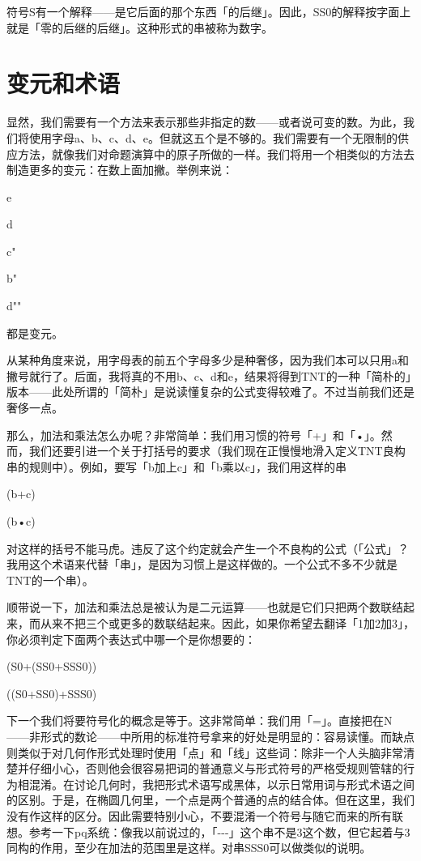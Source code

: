 \documentclass[
  12pt,
  twoside,
  openright,
  oldfontcommands,
]{memoir}
\begin{document}
符号S有一个解释------是它后面的那个东西「的后继」。因此，SS0的解释按字面上就是「零的后继的后继」。这种形式的串被称为数字。

\section{变元和术语}

显然，我们需要有一个方法来表示那些非指定的数------或者说可变的数。为此，我们将使用字母a、b、c、d、e。但就这五个是不够的。我们需要有一个无限制的供应方法，就像我们对命题演算中的原子所做的一样。我们将用一个相类似的方法去制造更多的变元：在数上面加撇。举例来说：

e

d\textquotesingle{}

c"

b"\textquotesingle{}

d""

都是变元。

从某种角度来说，用字母表的前五个字母多少是种奢侈，因为我们本可以只用a和撇号就行了。后面，我将真的不用b、c、d和e，结果将得到TNT的一种「简朴的」版本------此处所谓的「简朴」是说读懂复杂的公式变得较难了。不过当前我们还是奢侈一点。

那么，加法和乘法怎么办呢？非常简单：我们用习惯的符号「+」和「•」。然而，我们还要引进一个关于打括号的要求（我们现在正慢慢地滑入定义TNT良构串的规则中）。例如，要写「b加上c」和「b乘以c」，我们用这样的串

(b+c)

(b•c)

对这样的括号不能马虎。违反了这个约定就会产生一个不良构的公式（「公式」？我用这个术语来代替「串」，是因为习惯上是这样做的。一个公式不多不少就是TNT的一个串）。

顺带说一下，加法和乘法总是被认为是二元运算------也就是它们只把两个数联结起来，而从来不把三个或更多的数联结起来。因此，如果你希望去翻译「1加2加3」，你必须判定下面两个表达式中哪一个是你想要的：

(S0+(SS0+SSS0))

((S0+SS0)+SSS0)

下一个我们将要符号化的概念是等于。这非常简单：我们用「=」。直接把在N------非形式的数论------中所用的标准符号拿来的好处是明显的：容易读懂。而缺点则类似于对几何作形式处理时使用「点」和「线」这些词：除非一个人头脑非常清楚并仔细小心，否则他会很容易把词的普通意义与形式符号的严格受规则管辖的行为相混淆。在讨论几何时，我把形式术语写成黑体，以示日常用词与形式术语之间的区别。于是，在椭圆几何里，一个点是两个普通的点的结合体。但在这里，我们没有作这样的区分。因此需要特别小心，不要混淆一个符号与随它而来的所有联想。参考一下pq系统：像我以前说过的，「-\/-\/-」这个串不是3这个数，但它起着与3同构的作用，至少在加法的范围里是这样。对串SSS0可以做类似的说明。
\end{document}
